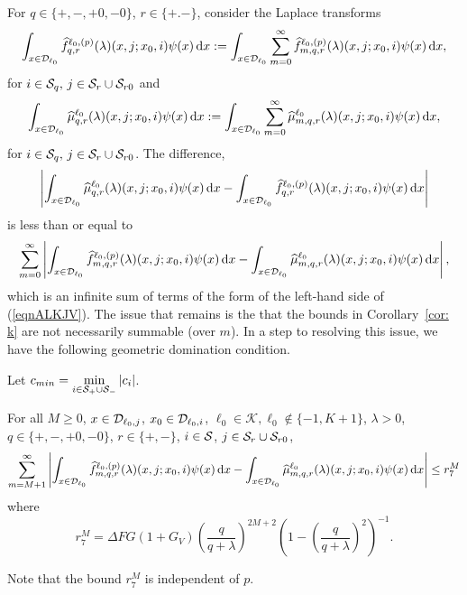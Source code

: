 For \(q\in\{+,-,+0,-0\}\), \(r\in\{+.-\}\), consider the Laplace transforms 
\[\int_{x\in\mathcal{D}_{\ell_0}} \widehat f^{\ell_0,(p)}_{q,r}(\lambda)(x,j;x_0,i)\psi(x)\, \mathrm{d} x := \int_{x\in\mathcal{D}_{\ell_0}} \sum_{m=0}^\infty \widehat f^{\ell_0,(p)}_{m,q,r}(\lambda)(x,j;x_0,i)\psi(x) \, \mathrm{d} x,\]
for \(i\in\mathcal{S}_q,\,j\in\mathcal{S}_r\cup\mathcal{S}_{r0}\) and 
\[\int_{x\in\mathcal{D}_{\ell_0}} \widehat \mu^{\ell_0}_{q,r}(\lambda)( x,j;x_0,i)\psi(x) \, \mathrm{d} x := \int_{x\in\mathcal{D}_{\ell_0}} \sum_{m=0}^\infty \widehat \mu^{\ell_0}_{m,q,r}(\lambda)( x,j;x_0,i)\psi(x) \, \mathrm{d} x,\]
for \(i\in\mathcal{S}_q,\,j\in\mathcal{S}_r\cup\mathcal{S}_{r0}\).
The difference, 
\[\left|\int_{x\in\mathcal{D}_{\ell_0}} \widehat \mu^{\ell_0}_{q,r}(\lambda)( x,j;x_0,i)\psi(x)\, \mathrm{d} x  - \int_{x\in\mathcal{D}_{\ell_0}} \widehat f^{\ell_0,(p)}_{q,r}(\lambda)(x,j;x_0,i)\psi(x) \, \mathrm{d} x \right|\] 
is less than or equal to 
\[\sum_{m=0}^\infty \left| \int_{x\in\mathcal{D}_{\ell_0}} \widehat f^{\ell_0,(p)}_{m,q,r}(\lambda)(x,j;x_0,i)\psi(x)\, \mathrm{d} x - \int_{x\in\mathcal{D}_{\ell_0}}  \widehat \mu^{\ell_0}_{m,q,r}(\lambda)(x,j;x_0,i)\psi(x) \, \mathrm{d} x\right|,\]
which is an infinite sum of terms of the form of the left-hand side of (\ref{eqnALKJV}). The issue that remains is the that the bounds in Corollary~\ref{cor: k} are not necessarily summable (over \(m\)). In a step to resolving this issue, we have the following geometric domination condition. 

Let \(c_{min} = \min\limits_{i\in\mathcal S_{+}\cup\mathcal{S}_-} |c_i|\).
\begin{lem}\label{lem: gkjljklgagjklagsjlk}For all \(M\geq 0\), \(x\in\mathcal{D}_{\ell_0,j}\), \(x_0\in\mathcal{D}_{\ell_0,i}\), \(\ell_0\in\mathcal K, \ell_0\notin\{-1,K+1\}\), \(\lambda > 0\), \(q\in\{+,-,+0,-0\}\), \(r\in\{+,-\}\), \(i\in\mathcal{S}\), \(j\in\mathcal{S}_r\cup\mathcal{S}_{r0}\),
	\begin{align}
		\sum_{m=M+1}^\infty \left| \int_{x\in\mathcal{D}_{\ell_0}} \widehat f^{\ell_0,(p)}_{m,q,r}(\lambda)(x,j;x_0,i)\psi(x)\, \mathrm{d} x
		-
		\int_{x\in\mathcal{D}_{\ell_0}} \widehat \mu^{\ell_0}_{m,q,r}(\lambda)(x,j;x_0,i)\psi(x) \, \mathrm{d} x\right| \leq r_7^M
	\end{align}
	where 
	\[r_7^M =  \Delta FG(1+G_V)\left(\frac{q}{q+\lambda}\right)^{2M+2} \left(1-\left(\frac{q}{q+\lambda}\right)^2\right)^{-1} .\]
\end{lem}
Note that the bound \(r_7^M\) is independent of \(p\). 

